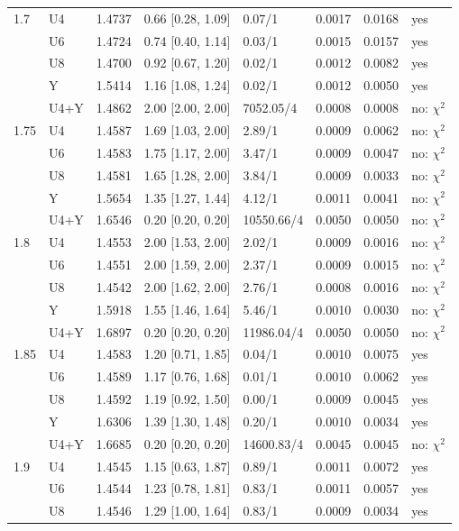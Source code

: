 {\begin{longtable}{@{}llllllll@{}}
1.7 & U4 & 1.4737 & 0.66 [0.28, 1.09] & 0.07/1 & 0.0017 & 0.0168 & yes \\
 & U6 & 1.4724 & 0.74 [0.40, 1.14] & 0.03/1 & 0.0015 & 0.0157 & yes \\
 & U8 & 1.4700 & 0.92 [0.67, 1.20] & 0.02/1 & 0.0012 & 0.0082 & yes \\
 & Y & 1.5414 & 1.16 [1.08, 1.24] & 0.02/1 & 0.0012 & 0.0050 & yes \\
 & U4+Y & 1.4862 & 2.00 [2.00, 2.00] & 7052.05/4 & 0.0008 & 0.0008 & no: $\chi^2$ \\
1.75 & U4 & 1.4587 & 1.69 [1.03, 2.00] & 2.89/1 & 0.0009 & 0.0062 & no: $\chi^2$ \\
 & U6 & 1.4583 & 1.75 [1.17, 2.00] & 3.47/1 & 0.0009 & 0.0047 & no: $\chi^2$ \\
 & U8 & 1.4581 & 1.65 [1.28, 2.00] & 3.84/1 & 0.0009 & 0.0033 & no: $\chi^2$ \\
 & Y & 1.5654 & 1.35 [1.27, 1.44] & 4.12/1 & 0.0011 & 0.0041 & no: $\chi^2$ \\
 & U4+Y & 1.6546 & 0.20 [0.20, 0.20] & 10550.66/4 & 0.0050 & 0.0050 & no: $\chi^2$ \\
1.8 & U4 & 1.4553 & 2.00 [1.53, 2.00] & 2.02/1 & 0.0009 & 0.0016 & no: $\chi^2$ \\
 & U6 & 1.4551 & 2.00 [1.59, 2.00] & 2.37/1 & 0.0009 & 0.0015 & no: $\chi^2$ \\
 & U8 & 1.4542 & 2.00 [1.62, 2.00] & 2.76/1 & 0.0008 & 0.0016 & no: $\chi^2$ \\
 & Y & 1.5918 & 1.55 [1.46, 1.64] & 5.46/1 & 0.0010 & 0.0030 & no: $\chi^2$ \\
 & U4+Y & 1.6897 & 0.20 [0.20, 0.20] & 11986.04/4 & 0.0050 & 0.0050 & no: $\chi^2$ \\
1.85 & U4 & 1.4583 & 1.20 [0.71, 1.85] & 0.04/1 & 0.0010 & 0.0075 & yes \\
 & U6 & 1.4589 & 1.17 [0.76, 1.68] & 0.01/1 & 0.0010 & 0.0062 & yes \\
 & U8 & 1.4592 & 1.19 [0.92, 1.50] & 0.00/1 & 0.0009 & 0.0045 & yes \\
 & Y & 1.6306 & 1.39 [1.30, 1.48] & 0.20/1 & 0.0010 & 0.0034 & yes \\
 & U4+Y & 1.6685 & 0.20 [0.20, 0.20] & 14600.83/4 & 0.0045 & 0.0045 & no: $\chi^2$ \\
1.9 & U4 & 1.4545 & 1.15 [0.63, 1.87] & 0.89/1 & 0.0011 & 0.0072 & yes \\
 & U6 & 1.4544 & 1.23 [0.78, 1.81] & 0.83/1 & 0.0011 & 0.0057 & yes \\
 & U8 & 1.4546 & 1.29 [1.00, 1.64] & 0.83/1 & 0.0009 & 0.0034 & yes \\

\end{longtable}}
